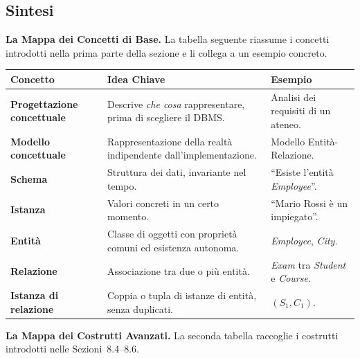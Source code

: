 \documentclass[12pt]{extarticle}
\begin{document}
\subsection{Sintesi}

\noindent \textbf{La Mappa dei Concetti di Base.} La tabella seguente riassume i concetti introdotti nella prima parte della sezione e li collega a un esempio concreto.

\begin{center}
\small
\begin{tabular}{@{}L{5.5cm}L{6.4cm}L{3.9cm}@{}}
    \toprule
    \textbf{Concetto} & \textbf{Idea Chiave} & \textbf{Esempio} \\
    \midrule
    \textbf{Progettazione concettuale} & Descrive \textit{che cosa} rappresentare, prima di scegliere il DBMS. & Analisi dei requisiti di un ateneo. \\
    \addlinespace
    \textbf{Modello concettuale} & Rappresentazione della realtà indipendente dall'implementazione. & Modello Entità-Relazione. \\
    \addlinespace
    \textbf{Schema} & Struttura dei dati, invariante nel tempo. & ``Esiste l'entità \textit{Employee}''. \\
    \addlinespace
    \textbf{Istanza} & Valori concreti in un certo momento. & ``Mario Rossi è un impiegato''. \\
    \addlinespace
    \textbf{Entità} & Classe di oggetti con proprietà comuni ed esistenza autonoma. & \textit{Employee}, \textit{City}. \\
    \addlinespace
    \textbf{Relazione} & Associazione tra due o più entità. & \textit{Exam} tra \textit{Student} e \textit{Course}. \\
    \addlinespace
    \textbf{Istanza di relazione} & Coppia o tupla di istanze di entità, senza duplicati. & $(S_1, C_1)$. \\
    \bottomrule
\end{tabular}
\end{center}

\medskip
\noindent \textbf{La Mappa dei Costrutti Avanzati.} La seconda tabella raccoglie i costrutti introdotti nelle Sezioni~8.4--8.6.
\end{document}
